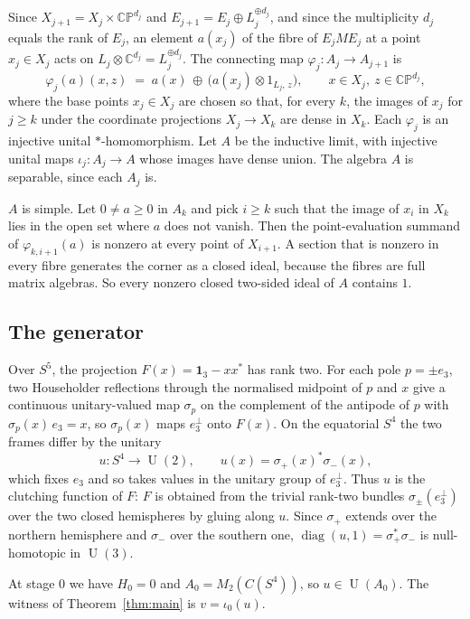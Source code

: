 \documentclass[11pt]{amsart}
\theoremstyle{plain}
\theoremstyle{definition}
\newcommand{\C}{\mathbb C}
\newcommand{\CP}{\mathbb{CP}}
\newcommand{\U}{\operatorname{U}}
\begin{document}
Since $X_{j+1} = X_j \times \CP^{d_j}$ and $E_{j+1} = E_j \oplus L_j^{\oplus
d_j}$, and since the multiplicity $d_j$ equals the rank of $E_j$, an element
$a(x_j)$ of the fibre of $E_j M E_j$ at a point $x_j \in X_j$ acts on
$L_j \otimes \C^{d_j} = L_j^{\oplus d_j}$.  The connecting map
$\varphi_j \colon A_j \to A_{j+1}$ is
\[
  \varphi_j(a)(x,z) \;=\; a(x) \,\oplus\, \bigl(a(x_j) \otimes 1_{L_j,\,z}\bigr),
  \qquad x \in X_j,\ z \in \CP^{d_j},
\]
where the base points $x_j \in X_j$ are chosen so that, for every $k$, the
images of $x_j$ for $j \geq k$ under the coordinate projections $X_j \to X_k$
are dense in $X_k$.  Each $\varphi_j$ is an injective unital $*$-homomorphism.
Let $A$ be the inductive limit, with injective unital maps
$\iota_j \colon A_j \to A$ whose images have dense union.  The algebra $A$ is
separable, since each $A_j$ is.

$A$ is simple.  Let $0 \neq a \geq 0$ in $A_k$ and pick $i \geq k$ such that
the image of $x_i$ in $X_k$ lies in the open set where $a$ does not vanish.
Then the point-evaluation summand of $\varphi_{k,i+1}(a)$ is nonzero at every
point of $X_{i+1}$.  A section that is nonzero in every fibre generates the
corner as a closed ideal, because the fibres are full matrix algebras.  So
every nonzero closed two-sided ideal of $A$ contains $1$.

\subsection{The generator}

Over $S^5$, the projection $F(x) = \mathbf 1_3 - x x^{*}$ has rank two.  For
each pole $p = \pm e_3$, two Householder reflections through the normalised
midpoint of $p$ and $x$ give a continuous unitary-valued map $\sigma_p$ on the
complement of the antipode of $p$ with $\sigma_p(x)\, e_3 = x$, so
$\sigma_p(x)$ maps $e_3^{\perp}$ onto $F(x)$.  On the equatorial $S^4$ the two
frames differ by the unitary
\[
  u \colon S^4 \longrightarrow \U(2), \qquad u(x) = \sigma_+(x)^{*}\sigma_-(x),
\]
which fixes $e_3$ and so takes values in the unitary group of $e_3^{\perp}$.
Thus $u$ is the clutching function of $F$: $F$ is obtained from the trivial
rank-two bundles $\sigma_{\pm}(e_3^{\perp})$ over the two closed hemispheres by
gluing along $u$.  Since $\sigma_+$ extends over the northern hemisphere and
$\sigma_-$ over the southern one, $\operatorname{diag}(u,1) = \sigma_+^{*}
\sigma_-$ is null-homotopic in $\U(3)$.

At stage $0$ we have $H_0 = 0$ and $A_0 = M_2(C(S^4))$, so $u \in \U(A_0)$.
The witness of Theorem~\ref{thm:main} is $v = \iota_0(u)$.
\end{document}
